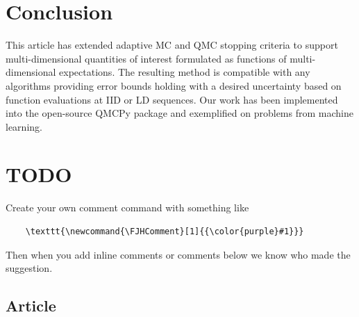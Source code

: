 \documentclass[graybox]{svmult}
\newcommand{\AGSComment}[1]{{\color{brown} #1}}
\newcommand{\FJHComment}[1]{{\color{purple}Fred:  #1}}
\begin{document}
\section{Conclusion} \label{sec:conclusions}

This article has extended adaptive MC and QMC stopping criteria to support multi-dimensional quantities of interest formulated as functions of multi-dimensional expectations. The resulting method is compatible with any algorithms providing error bounds holding with a desired uncertainty based on function evaluations at IID or LD sequences. Our work has been implemented into the open-source QMCPy package and exemplified on problems from machine learning. 

\printbibliography
% 
% 

\AGSComment{\section*{TODO}}

Create your own comment command with something like
\begin{verbatim}
    \texttt{\newcommand{\FJHComment}[1]{{\color{purple}#1}}}
\end{verbatim} 
Then when you add inline comments or comments below we know who made the suggestion. 

\subsection*{Article}
\end{document}
